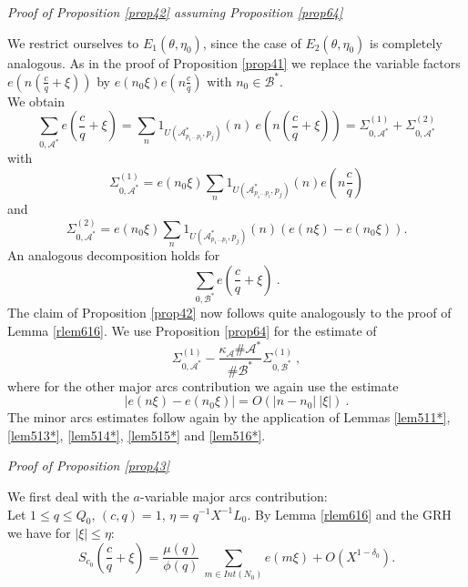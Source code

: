 \documentclass{amsart}
\numberwithin{equation}{subsection}
\begin{document}
\textit{Proof of Proposition \ref{prop42} assuming Proposition \ref{prop64}}

\noindent We restrict ourselves to $E_1(\theta, \eta_0)$, since the case of $E_2(\theta, \eta_0)$ is completely analogous. As in the proof of Proposition \ref{prop41} we replace the variable factors $e(n(\frac{c}{q}+\xi))$ by $e(n_0\xi)e(n\frac{c}{q})$ with $n_0\in\mathcal{B}^*$.\\
We obtain
$$\sum_{0, \mathcal{A}^*}e\left(\frac{c}{q}+\xi\right)=\sum_{n}1_{U(\mathcal{A}^*_{p_1\ldots p_l}, p_j)}(n)\:e\left(n\left(\frac{c}{q}+\xi\right)\right)=\Sigma_{0, \mathcal{A}^*}^{(1)}  +\Sigma_{0, \mathcal{A}^*}^{(2)}  $$
with
$$\Sigma_{0, \mathcal{A}^*}^{(1)}= e(n_0\xi) \sum_{n}1_{U(\mathcal{A}^*_{p_1\ldots p_l}, p_j)}(n) e\left(n\frac{c}{q}\right)$$
and
$$\Sigma_{0, \mathcal{A}^*}^{(2)}= e(n_0\xi) \sum_{n}1_{U(\mathcal{A}^*_{p_1\ldots p_l}, p_j)}(n) ( e(n\xi)-e(n_0\xi)).$$
An analogous decomposition holds for
$$\sum_{0, \mathcal{B}^*}e\left(\frac{c}{q}+\xi\right)\:.$$
The claim of Proposition \ref{prop42} now follows quite analogously to the proof of Lemma \ref{rlem616}. We use Proposition \ref{prop64} for the estimate of
$$\Sigma_{0, \mathcal{A}^*}^{(1)}  -\frac{\kappa_{\mathcal{A}}\#\mathcal{A}^*}{\#\mathcal{B}^*}  \Sigma_{0, \mathcal{B}^*}^{(1)}\:, $$
where for the other major arcs contribution we again use the estimate 
$$|e(n\xi)-e(n_0\xi)|=O(|n-n_0|\:|\xi|)\:.$$
The minor arcs estimates follow again by the application of Lemmas \ref{lem511*}, \ref{lem513*}, \ref{lem514*}, \ref{lem515*} and \ref{lem516*}.

\textit{Proof of Proposition \ref{prop43}}

\noindent We first deal with  the $a$-variable major arcs contribution:\\
Let $1\leq q\leq Q_0$, $(c, q)=1$, $\eta=q^{-1}X^{-1}L_0$. By Lemma \ref{rlem616} and the GRH we have for $|\xi|\leq \eta$:
$$S_{c_0}\left(\frac{c}{q}+\xi\right)=\frac{\mu(q)}{\phi(q)}\:\sum_{m\in Int(N_0)} e(m\xi)+O(X^{1-\delta_0}).$$
\end{document}
